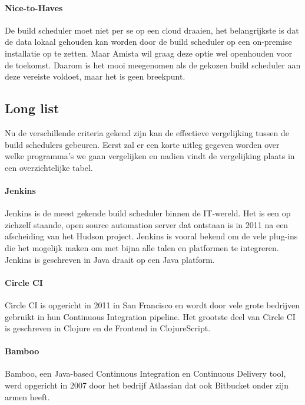             
            \paragraph{Nice-to-Haves}
            De build scheduler moet niet per se op een cloud draaien, het belangrijkste is dat de data lokaal gehouden kan worden door de build scheduler op een on-premise installatie op te zetten. Maar Amista wil graag deze optie wel openhouden voor de toekomst. Daarom is het mooi meegenomen als de gekozen build scheduler aan deze vereiste voldoet, maar het is geen breekpunt.

        \subsection{Long list}
        \label{subsec:Long-list}
        Nu de verschillende criteria gekend zijn kan de effectieve vergelijking tussen de build schedulers gebeuren.
        Eerst zal er een korte uitleg gegeven worden over welke programma's we gaan vergelijken en nadien vindt de vergelijking plaats in een overzichtelijke tabel.

            \paragraph{Jenkins}
            Jenkins is de meest gekende build scheduler binnen de IT-wereld. Het is een op zichzelf staande, open source automation server dat ontstaan is in 2011 na een afscheiding van het Hudson project. Jenkins is vooral bekend om de vele plug-ins die het mogelijk maken om met bijna alle talen en platformen te integreren. Jenkins is geschreven in Java draait op een Java platform.
            
            \paragraph{Circle CI}
            Circle CI is opgericht in 2011 in San Francisco en wordt door vele grote bedrijven gebruikt in hun Continuous Integration pipeline. Het grootste deel van Circle CI is geschreven in Clojure en de Frontend in ClojureScript. 
            
            \paragraph{Bamboo}
            Bamboo, een Java-based Continuous Integration en Continuous Delivery tool, werd opgericht in 2007 door het bedrijf Atlassian dat ook Bitbucket onder zijn armen heeft.
            
